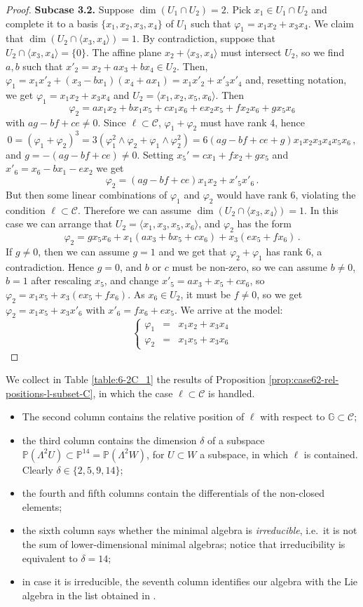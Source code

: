 \documentclass[10pt,reqno]{amsart}
\newcommand{\la}{\langle}
\newcommand{\ra}{\rangle}
\newcommand{\cC}{{\mathcal{C}}}
\newcommand{\GG}{\mathbb{G}}
\newcommand{\PP}{\mathbb P}
\newcommand{\f}{\varphi}
\renewcommand{\L}{\Lambda}
\theoremstyle{definition}
\begin{document}
\begin{proof}
\item \textbf{Subcase 3.2.} Suppose $\dim(U_1 \cap U_2)=2$. Pick $x_1 \in U_1 \cap U_2$ and complete it to a basis $\{x_1,x_2,x_3,x_4\}$ of $U_1$ such that $\f_1=x_1x_2+x_3x_4$. We claim that $\dim(U_2 \cap \la x_3, x_4 \ra)=1$. By contradiction, suppose that $U_2 \cap \la x_3, x_4 \ra =\{0\}$. The affine plane $x_2 + \la x_3, x_4 \ra$ must intersect $U_2$, so we find $a,b$ such that $x'_2=x_2+ax_3+bx_4\in U_2$. Then, $\f_1=x_1x'_2+(x_3-bx_1)(x_4+ax_1)=x_1x'_2+x'_3x'_4$ and, resetting notation, we get $\f_1=x_1x_2+x_3x_4$ and $U_2=\la x_1, x_2, x_5, x_6 \ra$. Then
\[
\f_2=ax_1x_2+bx_1x_5+cx_1x_6+ex_2x_5+fx_2x_6+gx_5x_6
\]
with $ag-bf+ce\neq 0$. Since $\ell\subset\cC$, $\f_1+\f_2$ must have rank 4, hence
\[
0=(\f_1+\f_2)^3=3(\f_1^2\wedge\f_2+\f_1\wedge\f_2^2)=6(ag-bf+ce+g)x_1x_2x_3x_4x_5x_6\,,
\]
and $g=-(ag-bf+ce)\neq 0$. Setting $x_5'=cx_1+fx_2+gx_5$ and $x'_6=x_6-bx_1-ex_2$ we get
\[
\f_2=(ag-bf+ce)x_1x_2+x'_5x'_6\,.
\]
But then some linear combinations of $\f_1$ and $\f_2$ would have rank 6, violating the condition $\ell\subset\cC$. Therefore we can assume $\dim(U_2 \cap \la x_3, x_4 \ra)=1$. In this case we can arrange that $U_2=\la x_1, x_3, x_5, x_6 \ra$, and $\f_2$ has the form
\[
\f_2=g x_5x_6+ x_1(ax_3+bx_5+cx_6)+x_3(ex_5+fx_6)\,.
\]
If $g\ne 0$, then we can assume $g=1$ and we get that $\f_2+\f_1$ has rank $6$, a contradiction. Hence $g=0$, and $b$ or $c$ must be non-zero, so we can assume $b \ne 0$, $b=1$ after rescaling $x_5$, and change $x'_5=ax_3+x_5+cx_6$, so $\f_2=x_1x_5+x_3(ex_5+fx_6)$. As $x_6 \in U_2$, it must be $f \ne 0$, so we get $\f_2=x_1x_5+x_3x'_6$ with $x'_6=fx_6+ex_5$. We arrive at the model:
\[
\left\{\begin{array}{ccl}
 \f_1 & = & x_1x_2+x_3x_4\\
 \f_2 & = & x_1x_5+x_3x_6
\end{array}\right.
\]
\end{proof}

\noindent We collect in Table \ref{table:6-2C_1} the results of Proposition \ref{prop:case62-rel-positions-l-subset-C}, in which the case $\ell\subset\cC$ is handled.
\begin{itemize}
    \item The second column contains the relative position of $\ell$ with respect to $\GG\subset\cC$;
    \item the third column contains the dimension $\delta$ of a subspace $\PP(\L^2 U) \subset \PP^{14}=\PP(\L^2 W)$, for $U\subset W$ a subspace, in which $\ell$ is contained. Clearly $\delta\in\{2,5,9,14\}$;
    \item the fourth and fifth columns contain the differentials of the non-closed elements;
    \item the sixth column says whether the minimal algebra is {\em irreducible}, i.e.~it is not the sum of lower-dimensional minimal algebras; notice that irreducibility is equivalent to $\delta=14$;
    \item in case it is irreducible, the seventh column identifies our algebra with the Lie algebra in the list obtained in \cite{Ren2011}.
\end{itemize}
\end{document}
